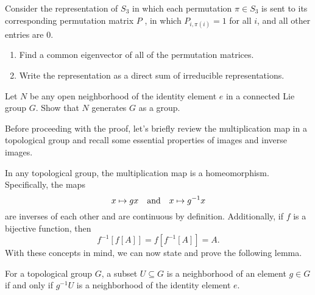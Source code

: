\documentclass[12pt]{memoir}
\begin{document}
\begin{Ej}
    Consider the representation of $S_3$ in which each permutation $\pi\in S_3$ is sent to its corresponding permutation matrix $P$ , in which $P_{i,\pi(i)}=1$ for all $i$, and all other entries are $0$.
    \begin{enumerate}
        \item Find a common eigenvector of all of the permutation matrices.
        \item Write the representation as a direct sum of irreducible representations.
    \end{enumerate}
\end{Ej}
\begin{Ej}
    Let $N$ be any open neighborhood of the identity element $e$ in a connected Lie group $G$.
Show that $N$ generates $G$ as a group.
\end{Ej}



Before proceeding with the proof, let's briefly review the multiplication map in a topological group and recall some essential properties of images and inverse images.

\begin{Rmk}
In any topological group, the multiplication map is a homeomorphism. Specifically, the maps 
$$x \mapsto gx \quad\text{and}\quad x \mapsto g^{-1}x$$
are inverses of each other and are continuous by definition. Additionally, if $f$ is a bijective function, then 
$$f^{-1}[f[A]] = f[f^{-1}[A]] = A.$$
With these concepts in mind, we can now state and prove the following lemma.
\end{Rmk}

\begin{Lem}
For a topological group $G$, a subset $U \subseteq G$ is a neighborhood of an element $g \in G$ if and only if $g^{-1}U$ is a neighborhood of the identity element $e$.
\end{Lem}
\end{document}
